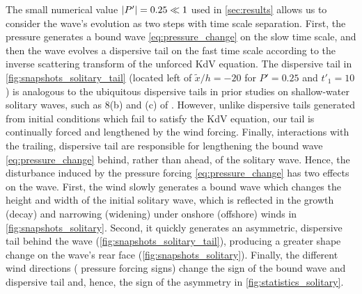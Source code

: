 \documentclass{jfm}
\begin{document}
The small numerical value $\abs{P'} = 0.25 \ll 1$ used in
\cref{sec:results} allows us to consider the wave's evolution as two
steps with time scale separation.
First, the pressure generates a bound wave \cref{eq:pressure_change} on
the slow time scale, and then the wave evolves a dispersive tail on the
fast time scale according to the inverse scattering transform of the
unforced KdV equation.
The dispersive tail in \cref{fig:snapshots_solitary_tail} (\eg located
left of $\tilde{x}/h=-20$ for $P'=0.25$ and $t'_1=10$) is analogous to the
ubiquitous dispersive tails in prior studies on shallow-water solitary
waves, such as \figsname{} 8(b) and (c) of \citet{hammack1974korteweg}.
However, unlike dispersive tails generated from initial conditions which
fail to satisfy the KdV equation, our tail is continually forced and
lengthened by the wind forcing.
Finally, interactions with the trailing, dispersive tail are responsible
for lengthening the bound wave \cref{eq:pressure_change} behind, rather
than ahead, of the solitary wave.
Hence, the disturbance induced by the pressure forcing
\cref{eq:pressure_change} has two effects on the wave.
First, the wind slowly generates a bound wave which changes the height
and width of the initial solitary wave, which is reflected in the growth
(decay) and narrowing (widening) under onshore (offshore) winds in
\cref{fig:snapshots_solitary}.
Second, it quickly generates an asymmetric, dispersive tail behind the
wave (\cref{fig:snapshots_solitary_tail}), producing a greater shape
change on the wave's rear face (\cref{fig:snapshots_solitary}).
Finally, the different wind directions (\ie{} pressure forcing signs)
change the sign of the bound wave and dispersive tail and, hence, the
sign of the asymmetry in \cref{fig:statistics_solitary}.
\end{document}

